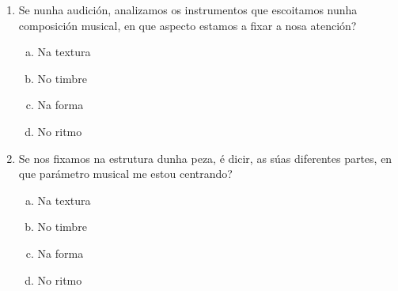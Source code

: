 % 
%
\begin{multicols}{2}

\begin{ejercicio}
 \begin{enumerate}[1)]
  \item 
  Se nunha audición, analizamos os instrumentos que escoitamos nunha composición musical, en que aspecto estamos a fixar a nosa atención?

  \begin{enumerate}[a)]
   \item 
   Na textura
   \item %
   No timbre
   \item
   Na forma
   \item
   No ritmo
  
  \end{enumerate}
  
  \item
  Se nos fixamos na estrutura dunha peza, é dicir, as súas diferentes partes, en que parámetro musical me estou centrando?
  
  \begin{enumerate}[a)]
   \item 
   Na textura
   \item 
   No timbre
   \item %
   Na forma
   \item
   No ritmo
  \end{enumerate}
 
 \end{enumerate}

\end{ejercicio}

\end{multicols}


